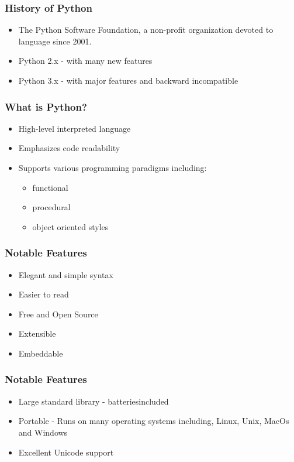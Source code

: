 \documentclass[14pt]{beamer}
\begin{document}
    \begin{frame}
        \frametitle{History of Python}
        \begin{itemize}
            \item The Python Software Foundation, a non-profit organization devoted to language since 2001.
            \item Python 2.x - with many new features
            \item Python 3.x - with major features and backward incompatible
        \end{itemize}
    \end{frame}
    \begin{frame}
        \frametitle{What is Python?}
        \begin{itemize}
            \item High-level interpreted language
            \item Emphasizes code readability
            \item Supports various programming paradigms including:
                \begin{itemize}
                    \item functional
                    \item procedural
                    \item object oriented styles
                \end{itemize}
        \end{itemize}
    \end{frame}
    \begin{frame}
        \frametitle{Notable Features}
        \begin{itemize}
            \item Elegant and simple syntax
            \item Easier to read
            \item Free and Open Source
            \item Extensible
            \item Embeddable
        \end{itemize}
    \end{frame}
    \begin{frame}
        \frametitle{Notable Features}
        \begin{itemize}

            \item Large standard library - batteriesincluded
            \item Portable - Runs on many operating systems including, Linux, Unix, MacOs and Windows
            \item Excellent Unicode support
        \end{itemize}
    \end{frame}
\end{document}
